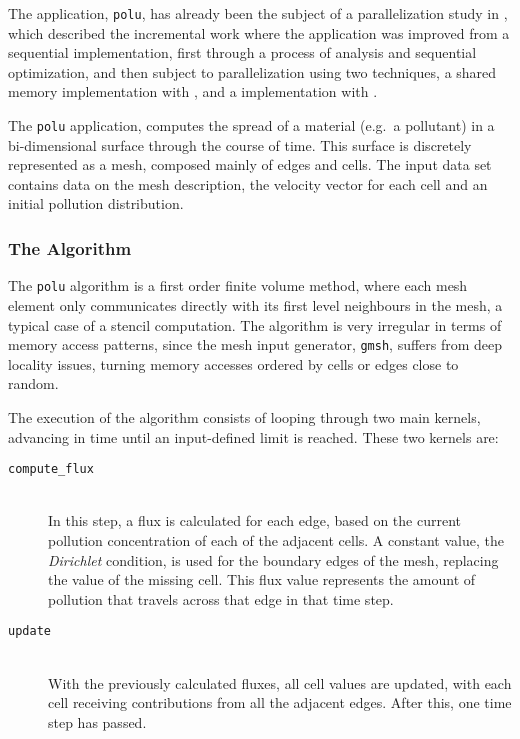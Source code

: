 \documentclass[main.tex]{subfiles}
\begin{document}
The application, \texttt{polu}, has already been the subject of a parallelization study in \cite{naps2012}, which described the incremental work where the application was improved from a sequential implementation, first through a process of analysis and sequential optimization, and then subject to parallelization using two techniques, a shared memory \cpu implementation with \openmp, and a \gpu implementation with \cuda.

The \texttt{polu} application, computes the spread of a material (e.g.\ a pollutant) in a bi-dimensional surface through the course of time. This surface is discretely represented as a mesh, composed mainly of edges and cells. The input data set contains data on the mesh description, the velocity vector for each cell and an initial pollution distribution.

\subsubsection{The Algorithm} \label{sec:polu:alg}

The \texttt{polu} algorithm is a first order finite volume method, where each mesh element only communicates directly with its first level neighbours in the mesh, a typical case of a stencil computation. The algorithm is very irregular in terms of memory access patterns, since the mesh input generator, \texttt{gmsh}, suffers from deep locality issues, turning memory accesses ordered by cells or edges close to random.

The execution of the algorithm consists of looping through two main kernels, advancing in time until an input-defined limit is reached. These two kernels are:
\begin{description}
\item[\texttt{compute\_flux}] \hfill \\
  In this step, a flux is calculated for each edge, based on the current pollution concentration of each of the adjacent cells. A constant value, the \textit{Dirichlet} condition, is used for the boundary edges of the mesh, replacing the value of the missing cell. This flux value represents the amount of pollution that travels across that edge in that time step.

\item[\texttt{update}] \hfill \\
  With the previously calculated fluxes, all cell values are updated, with each cell receiving contributions from all the adjacent edges. After this, one time step has passed.
\end{description}
\end{document}
